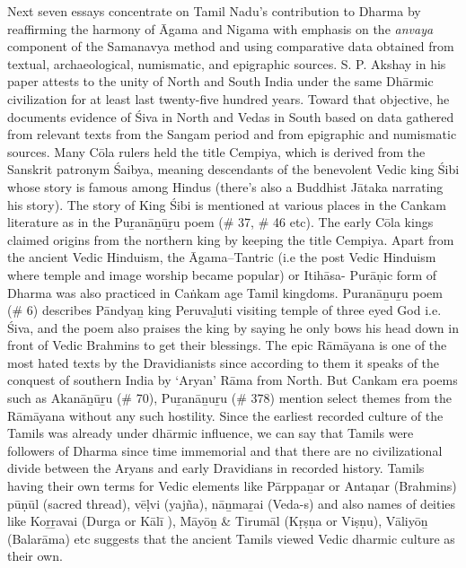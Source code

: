 Next seven essays concentrate on Tamil Nadu’s contribution to Dharma by reaffirming the harmony of Āgama and Nigama with emphasis on the \textit{anvaya} component of the Samanavya method and using comparative data obtained from textual, archaeological, numismatic, and epigraphic sources. S. P. Akshay in his paper attests to the unity of North and South India under the same Dhārmic civilization for at least last twenty-five hundred years. Toward that objective, he documents evidence of Śiva in North and Vedas in South based on data gathered from relevant texts from the Sangam period and from epigraphic and numismatic sources. Many Cōla rulers held the title Cempiya, which is derived from the Sanskrit patronym Śaibya, meaning descendants of the benevolent Vedic king Śibi whose story is famous among Hindus (there's also a Buddhist Jātaka narrating his story). The story of King Śibi is mentioned at various places in the Cankam literature as in the Puṟanāṉūṟu poem (\# 37, \# 46 etc). The early Cōla kings claimed origins from the northern king by keeping the title Cempiya. Apart from the ancient Vedic Hinduism, the Āgama--Tantric (i.e the post Vedic Hinduism where temple and image worship became popular) or Itihāsa- Purāņic form of Dharma was also practiced in Caṅkam age Tamil kingdoms. Puranāṉuṟu poem (\# 6) describes Pāndyaṉ king Peruvaḻuti visiting temple of three eyed God i.e. Śiva, and the poem also praises the king by saying he only bows his head down in front of Vedic Brahmins to get their blessings. The epic Rāmāyana is one of the most hated texts by the Dravidianists since according to them it speaks of the conquest of southern India by ‘Aryan’ Rāma from North. But Cankam era poems such as Akanāṉūṟu (\# 70), Puṟanāṉuṟu (\# 378) mention select themes from the Rāmāyana without any such hostility. Since the earliest recorded culture of the Tamils was already under dhārmic influence, we can say that Tamils were followers of Dharma since time immemorial and that there are no civilizational divide between the Aryans and early Dravidians in recorded history. Tamils having their own terms for Vedic elements like Pārppaṉar or Antaṇar (Brahmins) pūṇūl (sacred thread), vēḷvi (yajña), nāṉmaṟai (Veda-s) and also names of deities like Koṟṟavai (Durga or Kālī ), Māyōṉ \& Tirumāl (Kṛṣṇa or Viṣṇu), Vāliyōṉ (Balarāma) etc suggests that the ancient Tamils viewed Vedic dharmic culture as their own.

